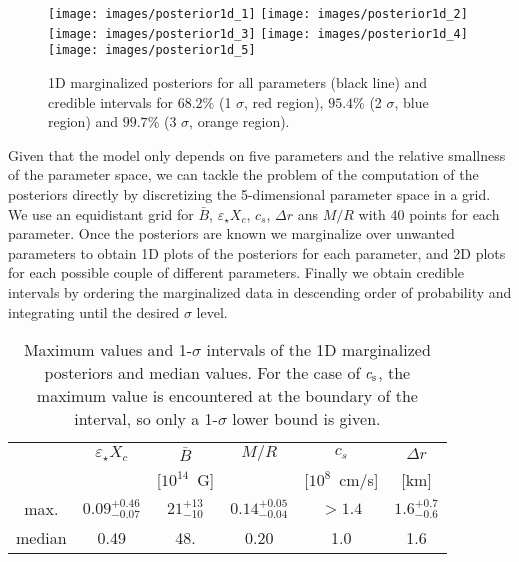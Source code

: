 \documentclass[useAMS,usenatbib]{mnras}
\begin{document}
\begin{figure}
\texttt{[image: images/posterior1d\_1]}
\hspace{-0.2cm}
\texttt{[image: images/posterior1d\_2]}
\\
\texttt{[image: images/posterior1d\_3]}
\hspace{-0.2cm}
\texttt{[image: images/posterior1d\_4]}
\\
\texttt{[image: images/posterior1d\_5]}
\caption{1D marginalized posteriors for all  parameters (black line) and
credible intervals for $68.2\%$ (1 $\sigma$, red region), $95.4\%$ (2 $\sigma$, 
blue region)
and $99.7\%$ (3 $\sigma$, orange region).
}
\label{fig_post1d}
\end{figure}

Given that the model only depends on five parameters and the relative 
smallness of the parameter space, 
we can tackle the problem of the computation of the posteriors directly by
discretizing the 5-dimensional
parameter space in a grid. We use an equidistant grid for $\bar{B}$, 
$\varepsilon_\star X_c$, $c_s$, $\Delta r$ ans $M/R$ with $40$ points for each 
parameter. Once the posteriors are known we marginalize over unwanted parameters 
to obtain 1D plots of the posteriors for each parameter, and 2D plots for each 
possible couple of different parameters. Finally we obtain credible intervals by 
ordering the marginalized data in descending order of probability and 
integrating until the desired $\sigma$ level. 

\begin{table}
\setlength{\tabcolsep}{5pt}
\begin{tabular}{c c c c cc}
\hline
&$\varepsilon_\star X_c$ & $\bar B$ & $M/R$ & $c_s$ & 
$\Delta r$ \\ 
& & [$10^{14}$~G] & & [$10^8$~cm/s] &[km] \\ \hline
max. 
&$0.09^{+0.46}_{-0.07}$  
& $21^{+13}_{-10}$ 
 & $0.14^{+0.05}_{-0.04}$  
& $>1.4$
& $1.6^{+0.7}_{-0.6}$\\ 
median  
& 0.49
& 48.
& 0.20
& 1.0
& 1.6\\
\hline
\end{tabular}
\caption{Maximum values and 1-$\sigma$ intervals of the 1D marginalized 
posteriors and median values. For the case of $c_{\rm s}$, the maximum value 
is encountered at the boundary of the interval, so only a 1-$\sigma$ lower 
bound is given.}
\label{tab_median}
\end{table}
%
%
\end{document}
